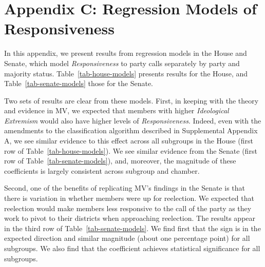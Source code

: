 \documentclass[12pt]{article}
\begin{document}
\clearpage


\section*{Appendix C: Regression Models of Responsiveness}
%


In this appendix, we present results from regression models in the House and
Senate, which model \textit{Responsiveness} to party calls separately by party
and majority status.
Table~\ref{tab-house-models} presents results for the House, and
Table~\ref{tab-senate-models} those for the Senate.

Two sets of results are clear from these models.
First, in keeping with the theory and evidence in MV, we expected that members
with higher \textit{Ideological Extremism} would also have higher levels of
\textit{Responsiveness}.
Indeed, even with the amendments to the classification algorithm described in
Supplemental Appendix A, we see similar evidence to this effect across all
subgroups in the House (first row of Table~\ref{tab-house-models}).
We see similar evidence from the Senate (first row of
Table~\ref{tab-senate-models}), and, moreover, the magnitude of these
coefficients is largely consistent across subgroup and chamber.

Second, one of the benefits of replicating MV's findings in the Senate is that
there is variation in whether members were up for reelection.
We expected that reelection would make members less responsive to the call of
the party as they work to pivot to their districts when approaching reelection.
The results appear in the third row of Table~\ref{tab-senate-models}.
We find first that the sign is in the expected direction and similar magnitude
(about one percentage point) for all subgroups.
We also find that the coefficient achieves statistical significance for all
subgroups.
\end{document}
